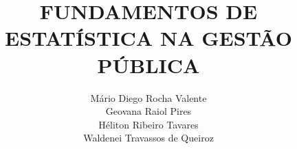 \title{FUNDAMENTOS DE ESTATÍSTICA NA GESTÃO PÚBLICA} 
\author{Mário Diego Rocha Valente  \\  Geovana Raiol Pires \\ Héliton Ribeiro Tavares \\ Waldenei Travassos de Queiroz }
\renewcommand{\lsISBNdigital}{000-0-000000-00-0}
\renewcommand{\lsISBNhardcover}{000-0-000000-00-0}
\renewcommand{\lsISBNsoftcover}{000-0-000000-00-0}
\renewcommand{\lsISBNsoftcoverus}{000-0-000000-00-0}
\renewcommand{\lsSeries}{cfls} %
\renewcommand{\lsSeriesNumber}{99} %


\setlength{\csspine}{25.0559784mm} %
\setlength{\bodspine}{20mm} %
